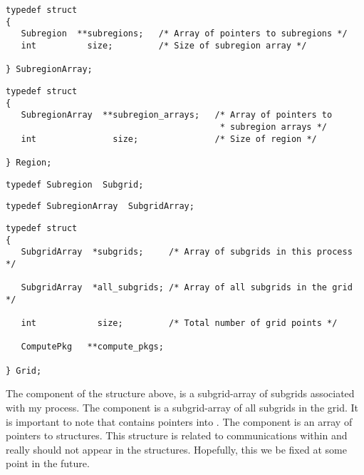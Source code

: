 \begin{display}\begin{verbatim}
typedef struct
{
   Subregion  **subregions;   /* Array of pointers to subregions */
   int          size;         /* Size of subregion array */

} SubregionArray;
\end{verbatim}\end{display}

\begin{display}\begin{verbatim}
typedef struct
{
   SubregionArray  **subregion_arrays;   /* Array of pointers to
                                          * subregion arrays */
   int               size;               /* Size of region */

} Region;
\end{verbatim}\end{display}

\begin{display}\begin{verbatim}
typedef Subregion  Subgrid;
\end{verbatim}\end{display}

\begin{display}\begin{verbatim}
typedef SubregionArray  SubgridArray;
\end{verbatim}\end{display}

\begin{display}\begin{verbatim}
typedef struct
{
   SubgridArray  *subgrids;     /* Array of subgrids in this process */

   SubgridArray  *all_subgrids; /* Array of all subgrids in the grid */

   int            size;         /* Total number of grid points */

   ComputePkg   **compute_pkgs;

} Grid;
\end{verbatim}\end{display}

The  component of the  structure above, is a
subgrid-array of subgrids associated with my process.
The  component is a subgrid-array of all subgrids
in the grid.
It is important to note that  contains pointers into
.
The  component is an array of pointers to
 structures.
This structure is related to communications within \parflow{} and
really should not appear in the  structures.
Hopefully, this we be fixed at some point in the future.

